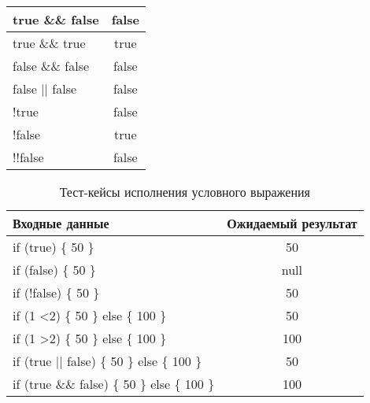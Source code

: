 \begin{table}[!ht]
\begin{threeparttable}
\begin{tabularx}{\textwidth}{|X|c|}
            \hline
            true \&\& false             & false               \\
            \hline
            true \&\& true              & true                \\
            \hline
            false \&\& false            & false               \\
            \hline
            false || false              & false               \\
            \hline
            !true                       & false               \\
            \hline
            !false                      & true                \\
            \hline
            !!false                     & false               \\
            \hline
        \end{tabularx}
    \end{threeparttable}
    \vspace{\bottompaddingoftable}
\end{table}

\clearpage

\begin{table}[!ht]
    \Large
    \centering
    \begin{threeparttable}
        \caption{Тест-кейсы исполнения условного выражения}
        \label{t:testCases_conditionExpr}
        \begin{tabularx}{\textwidth}{|X|c|}
            \hline
            Входные данные                                 & Ожидаемый результат \\
            \hline
            if (true) \{ 50 \}                             & 50                  \\
            \hline
            if (false) \{ 50 \}                            & null                \\
            \hline
            if (!false) \{ 50 \}                           & 50                  \\
            \hline
            if (1 \textless 2) \{ 50 \} else \{ 100 \}     & 50                  \\
            \hline
            if (1 \textgreater 2) \{ 50 \} else \{ 100 \}  & 100                 \\
            \hline
            if (true || false) \{ 50 \} else \{ 100 \}     & 50                  \\
            \hline
            if (true   \&\& false) \{ 50 \} else \{ 100 \} & 100                 \\
            \hline
        \end{tabularx}
    \end{threeparttable}
    \vspace{\bottompaddingoftable}
\end{table}

